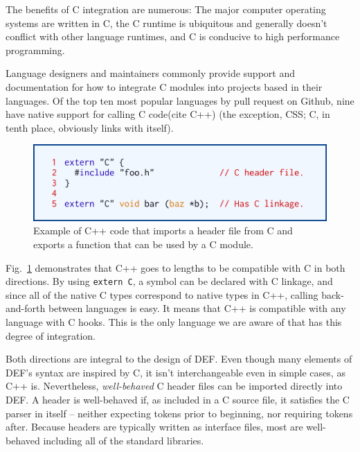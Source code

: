 The benefits of C integration are numerous: The major computer operating systems are written in C,\cite{Linux, Darwin, WindowsKernel} the C runtime is ubiquitous and generally doesn't conflict with other language runtimes, and C is conducive to high performance programming.

Language designers and maintainers commonly provide support and documentation for how to integrate C modules into projects based in their languages.  Of the top ten most popular languages by pull request on Github,\cite{Octoverse} nine have native support for calling C code\cite{JavascriptCiface, PythonCiface, JavaCiface, RubyCiface, PHPCiface, DotNetCiface, GoCiface}(cite C++) (the exception, CSS; C, in tenth place, obviously links with itself).

\begin{figure}[htbp!]
        \centering
        \includegraphics[scale=0.25]{gfx/extern}
        \caption{Example of C++ code that imports a header file from C and exports a function that can be used by a C module.}
        \label{fig:extern-example}
\end{figure}

Fig.~\ref{fig:extern-example} demonstrates that C++ goes to lengths to be compatible with C in both directions.  By using \texttt{extern \textquotedbl{}C\textquotedbl{}}, a symbol can be declared with C linkage, and since all of the native C types correspond to native types in C++, calling back-and-forth between languages is easy.  It means that C++ is compatible with any language with C hooks.  This is the only language we are aware of that has this degree of integration.

Both directions are integral to the design of DEF.  Even though many elements of DEF's syntax are inspired by C, it isn't interchangeable even in simple cases, as C++ is.  Nevertheless, \textit{well-behaved} C header files can be imported directly into DEF.  A header is well-behaved if, as included in a C source file, it satisfies the C parser in itself -- neither expecting tokens prior to beginning, nor requiring tokens after.  Because headers are typically written as interface files, most are well-behaved including all of the standard libraries.
